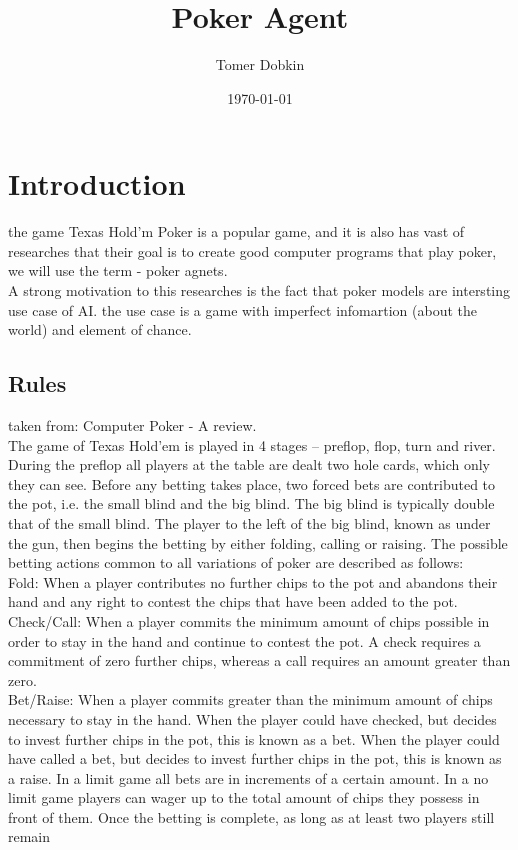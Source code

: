 \documentclass{article}
\title{Poker Agent}
\author{Tomer Dobkin}
\date{\today}
\begin{document}
\maketitle
\section{Introduction}
the game Texas Hold'm Poker is a popular game, and it is also has vast of researches that their goal is to create good computer programs that play poker, we will use the term -  poker agnets.\\
A strong motivation to this researches is the fact that  poker models are intersting use case of AI. the use case is a game with imperfect infomartion (about the world) and element of chance.
\subsection{Rules}
taken from: Computer Poker - A review.\\
The game of Texas Hold’em is played in 4 stages – preflop, flop, turn and river. During the preflop all players at the
table are dealt two hole cards, which only they can see. Before any betting takes place, two forced bets are contributed to
the pot, i.e. the small blind and the big blind. The big blind is typically double that of the small blind. The player to the left
of the big blind, known as under the gun, then begins the betting by either folding, calling or raising. The possible betting
actions common to all variations of poker are described as follows:\\
Fold: When a player contributes no further chips to the pot and abandons their hand and any right to contest the chips
that have been added to the pot.\\
Check/Call: When a player commits the minimum amount of chips possible in order to stay in the hand and continue to
contest the pot. A check requires a commitment of zero further chips, whereas a call requires an amount greater
than zero.\\
Bet/Raise: When a player commits greater than the minimum amount of chips necessary to stay in the hand. When the
player could have checked, but decides to invest further chips in the pot, this is known as a bet. When the player
could have called a bet, but decides to invest further chips in the pot, this is known as a raise.
In a limit game all bets are in increments of a certain amount. In a no limit game players can wager up to the total
amount of chips they possess in front of them. Once the betting is complete, as long as at least two players still remain
\end{document}
